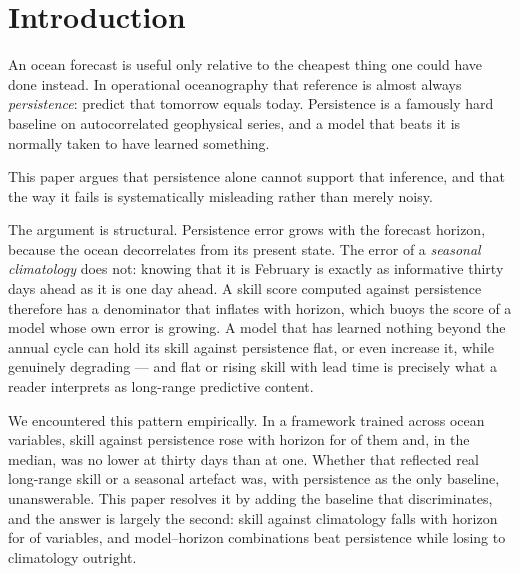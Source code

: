 %

\section{Introduction}

An ocean forecast is useful only relative to the cheapest thing one could have
done instead. In operational oceanography that reference is almost always
\emph{persistence}: predict that tomorrow equals today. Persistence is a
famously hard baseline on autocorrelated geophysical series, and a model that
beats it is normally taken to have learned something.

This paper argues that persistence alone cannot support that inference, and
that the way it fails is systematically misleading rather than merely noisy.

The argument is structural. Persistence error grows with the forecast horizon,
because the ocean decorrelates from its present state. The error of a
\emph{seasonal climatology} does not: knowing that it is February is exactly as
informative thirty days ahead as it is one day ahead. A skill score computed
against persistence therefore has a denominator that inflates with horizon,
which buoys the score of a model whose own error is growing. A model that has
learned nothing beyond the annual cycle can hold its skill against persistence
flat, or even increase it, while genuinely degrading --- and flat or rising
skill with lead time is precisely what a reader interprets as long-range
predictive content.

We encountered this pattern empirically. In a framework trained across
\NVars{} ocean variables, skill against persistence rose with horizon for
\NRising{} of them and, in the median, was no lower at thirty days than at one.
Whether that reflected real long-range skill or a seasonal artefact was, with
persistence as the only baseline, unanswerable. This paper resolves it by
adding the baseline that discriminates, and the answer is largely the second:
skill against climatology falls with horizon for \NFallingClim{} of \NVars{}
variables, and \NLoseToClim{} model--horizon combinations beat persistence
while losing to climatology outright.

